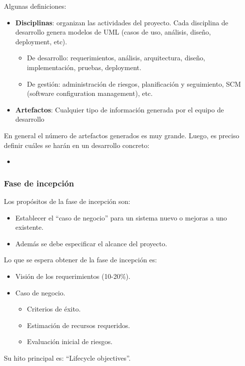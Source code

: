 \documentclass[]{article}
\begin{document}
Algunas definiciones:
\begin{itemize}
	\item \textbf{Disciplinas}: organizan las actividades del proyecto. Cada disciplina de desarrollo genera modelos de UML (casos de uso, análisis, diseño, deployment, etc).
	\begin{itemize}
		\item De desarrollo: requerimientos, análisis, arquitectura, diseño, implementación, pruebas, deployment.
		\item De gestión: administración de riesgos, planificación y seguimiento, SCM (software configuration management), etc.
	\end{itemize}
	\item \textbf{Artefactos}: Cualquier tipo de información generada por el equipo de desarrollo
\end{itemize}

En general el número de artefactos generados es muy grande. Luego, es preciso definir cuáles se harán en un desarrollo concreto:
\begin{itemize}
	\item
\end{itemize}


\subsubsection{Fase de incepción}
Los propósitos de la fase de incepción son:
\begin{itemize}
 	\item Establecer el ``caso de negocio'' para un sistema nuevo o mejoras a uno existente.
 	\item Además se debe especificar el alcance del proyecto.
 \end{itemize}

Lo que se espera obtener de la fase de incepción es:
\begin{itemize}
	\item Visión de los requerimientos (10-20\%).
	\item Caso de negocio.
	\begin{itemize}
		\item Criterios de éxito.
		\item Estimación de recursos requeridos.
		\item Evaluación inicial de riesgos.
	\end{itemize}
\end{itemize}
Su hito principal es: ``Lifecycle objectives''.
\end{document}
